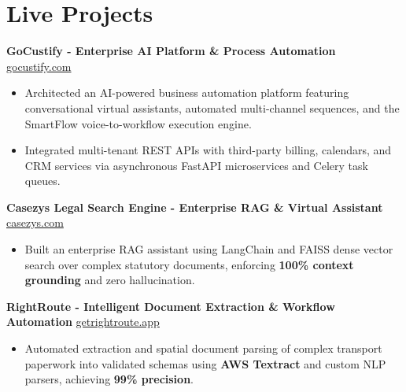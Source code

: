 \documentclass[9.5pt,a4paper]{article}
\begin{document}
\section*{Live Projects}
\noindent
\textbf{GoCustify - Enterprise AI Platform \& Process Automation} \hfill \href{https://gocustify.com}{gocustify.com}
\begin{itemize}
    \item Architected an AI-powered business automation platform featuring conversational virtual assistants, automated multi-channel sequences, and the SmartFlow voice-to-workflow execution engine.
    \item Integrated multi-tenant REST APIs with third-party billing, calendars, and CRM services via asynchronous FastAPI microservices and Celery task queues.
\end{itemize}
\vspace{0.6pt}
\noindent
\textbf{Casezys Legal Search Engine - Enterprise RAG \& Virtual Assistant} \hfill \href{https://casezys.com}{casezys.com}
\begin{itemize}
    \item Built an enterprise RAG assistant using LangChain and FAISS dense vector search over complex statutory documents, enforcing \textbf{100\% context grounding} and zero hallucination.
\end{itemize}
\vspace{0.6pt}
\noindent
\textbf{RightRoute - Intelligent Document Extraction \& Workflow Automation} \hfill \href{https://getrightroute.app}{getrightroute.app}
\begin{itemize}
    \item Automated extraction and spatial document parsing of complex transport paperwork into validated schemas using \textbf{AWS Textract} and custom NLP parsers, achieving \textbf{99\% precision}.
\end{itemize}
\vspace{0.6pt}
\end{document}

